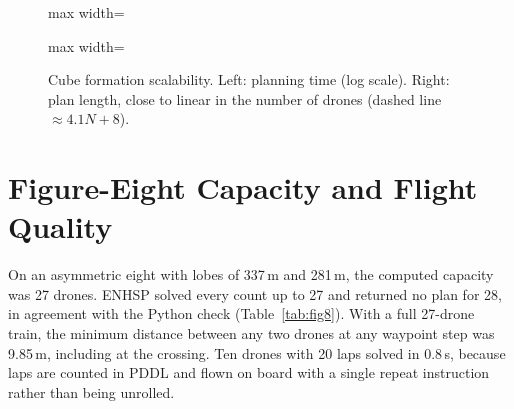 \documentclass[11pt,a4paper,oneside]{report}
\begin{document}
\begin{figure}[H]
\centering
\begin{adjustbox}{max width=\linewidth}
\end{adjustbox}\hfill
\begin{adjustbox}{max width=\linewidth}
\end{adjustbox}
\caption[Cube planning scalability]{Cube formation scalability. Left: planning time (log scale). Right: plan length, close to
linear in the number of drones (dashed line $\approx 4.1N + 8$).}
\label{fig:cubeplot}
\end{figure}

\section{Figure-Eight Capacity and Flight Quality}
On an asymmetric eight with lobes of 337\,m and 281\,m, the computed capacity was 27 drones. ENHSP
solved every count up to 27 and returned no plan for 28, in agreement with the Python check
(Table~\ref{tab:fig8}). With a full 27-drone train, the minimum distance between any two drones at
any waypoint step was 9.85\,m, including at the crossing. Ten drones with 20 laps solved in 0.8\,s,
because laps are counted in PDDL and flown on board with a single repeat instruction rather than
being unrolled.
\end{document}
